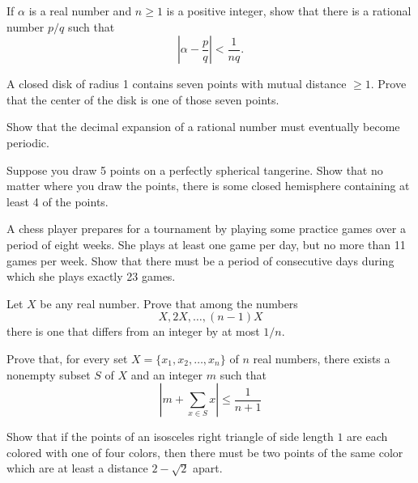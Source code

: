 \documentclass{article}
\begin{document}
\begin{exercise}
    If \(\alpha\) is a real number and \(n\geq 1\) is a positive integer, show that there is a rational number \(p/q\) such that
    \[\left|\alpha-\frac{p}{q}\right|<\frac{1}{nq}.\]
\end{exercise}

\begin{exercise}
    A closed disk of radius 1 contains seven points with mutual distance \(\geq 1\).
    Prove that the center of the disk is one of those seven points.
\end{exercise}

\begin{exercise}
    Show that the decimal expansion of a rational number must eventually become periodic.
\end{exercise}

\begin{exercise}
    Suppose you draw 5 points on a perfectly spherical tangerine.
    Show that no matter where you draw the points, there is some closed hemisphere containing at least 4 of the points.
\end{exercise}

\begin{exercise}
    A chess player prepares for a tournament by playing some practice games over a period of eight weeks. 
    She plays at least one game per day, but no more than 11 games per week. 
    Show that there must be a period of consecutive days during which she plays exactly 23 games.
\end{exercise}

\begin{exercise}
    Let \(X\) be any real number. Prove that among the numbers 
    \[X,2X,\dots,(n-1)X\] 
    there is one that differs from an integer by at most \(1/n\).
\end{exercise}

\begin{exercise}[2006 B2]
    Prove that, for every set \(X=\{x_1,x_2,\dots,x_n\}\) of \(n\) real numbers, there exists a nonempty subset \(S\) of \(X\) and an integer \(m\) such that 
    \[\left|m+\sum_{x\in S} x\right| \leq \frac{1}{n+1}\]
\end{exercise}
    
\begin{exercise}[1994 A3]
    Show that if the points of an isosceles right triangle of side length $1$ are each colored with one of four colors, then there must be two points of the same color which are at least a distance \(2-\sqrt{2}\) apart. 
\end{exercise}
    
\end{document}

